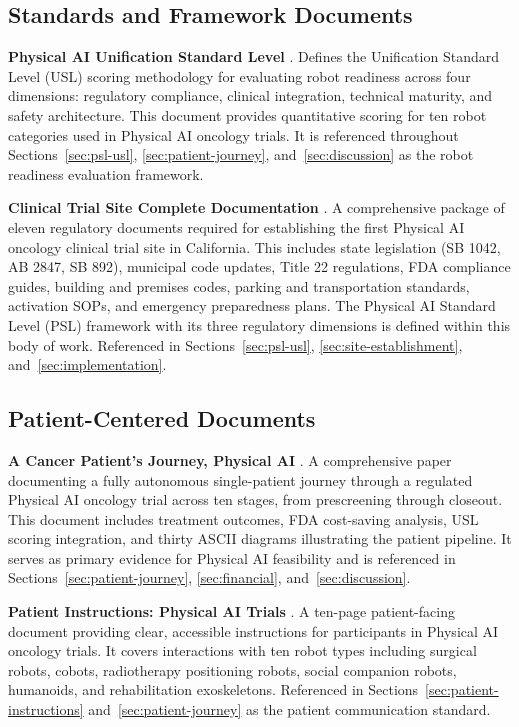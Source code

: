 \subsection*{Standards and Framework Documents}

\noindent\textbf{Physical AI Unification Standard Level} \cite{usl-standard}.
Defines the Unification Standard Level (USL) scoring methodology for evaluating
robot readiness across four dimensions: regulatory compliance, clinical
integration, technical maturity, and safety architecture. This document provides
quantitative scoring for ten robot categories used in Physical AI oncology
trials. It is referenced throughout Sections~\ref{sec:psl-usl},
\ref{sec:patient-journey}, and~\ref{sec:discussion} as the robot readiness
evaluation framework.

\vspace{0.3cm}
\noindent\textbf{Clinical Trial Site Complete Documentation} \cite{site-docs}.
A comprehensive package of eleven regulatory documents required for establishing
the first Physical AI oncology clinical trial site in California. This includes
state legislation (SB 1042, AB 2847, SB 892), municipal code updates, Title 22
regulations, FDA compliance guides, building and premises codes, parking and
transportation standards, activation SOPs, and emergency preparedness plans. The
Physical AI Standard Level (PSL) framework with its three regulatory dimensions
is defined within this body of work. Referenced in Sections~\ref{sec:psl-usl},
\ref{sec:site-establishment}, and~\ref{sec:implementation}.

\subsection*{Patient-Centered Documents}

\noindent\textbf{A Cancer Patient's Journey, Physical AI}
\cite{patient-journey-paper}.
A comprehensive paper documenting a fully autonomous single-patient journey
through a regulated Physical AI oncology trial across ten stages, from
prescreening through closeout. This document includes treatment outcomes, FDA
cost-saving analysis, USL scoring integration, and thirty ASCII diagrams
illustrating the patient pipeline. It serves as primary evidence for Physical AI
feasibility and is referenced in Sections~\ref{sec:patient-journey},
\ref{sec:financial}, and~\ref{sec:discussion}.

\vspace{0.3cm}
\noindent\textbf{Patient Instructions: Physical AI Trials}
\cite{patient-instructions-paper}.
A ten-page patient-facing document providing clear, accessible instructions for
participants in Physical AI oncology trials. It covers interactions with ten
robot types including surgical robots, cobots, radiotherapy positioning robots,
social companion robots, humanoids, and rehabilitation exoskeletons. Referenced
in Sections~\ref{sec:patient-instructions} and~\ref{sec:patient-journey} as the
patient communication standard.

